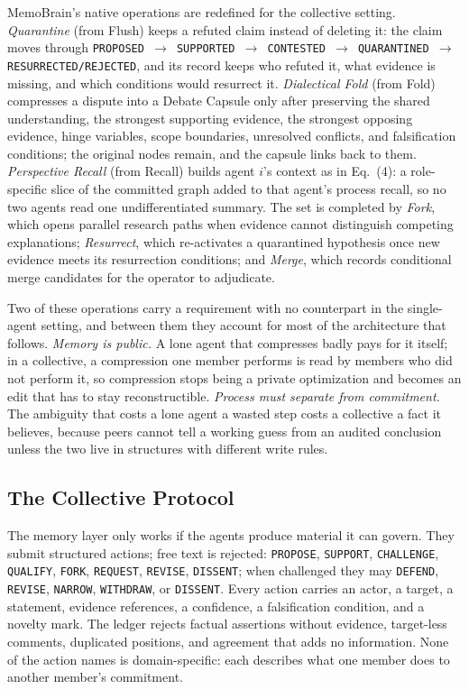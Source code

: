MemoBrain's native operations are redefined for the collective setting.
\emph{Quarantine} (from Flush) keeps a refuted claim instead of deleting it:
the claim moves through \texttt{PROPOSED $\rightarrow$ SUPPORTED $\rightarrow$
CONTESTED $\rightarrow$ QUARANTINED $\rightarrow$ RESURRECTED/REJECTED}, and
its record keeps who refuted it, what evidence is missing, and which conditions
would resurrect it. \emph{Dialectical Fold} (from Fold) compresses a dispute
into a Debate Capsule only after preserving the shared understanding, the
strongest supporting evidence, the strongest opposing evidence, hinge
variables, scope boundaries, unresolved conflicts, and falsification
conditions; the original nodes remain, and the capsule links back to them.
\emph{Perspective Recall} (from Recall) builds agent $i$'s context as in
Eq.~(4): a role-specific slice of the committed graph added to that agent's
process recall, so no two agents read one undifferentiated summary. The set is
completed by \emph{Fork}, which opens parallel research paths when evidence
cannot distinguish competing explanations; \emph{Resurrect}, which re-activates
a quarantined hypothesis once new evidence meets its resurrection conditions;
and \emph{Merge}, which records conditional merge candidates for the operator
to adjudicate.

Two of these operations carry a requirement with no counterpart in the
single-agent setting, and between them they account for most of the
architecture that follows. \emph{Memory is public.} A lone agent that
compresses badly pays for it itself; in a collective, a compression one member
performs is read by members who did not perform it, so compression stops being
a private optimization and becomes an edit that has to stay reconstructible.
\emph{Process must separate from commitment.} The ambiguity that costs a lone
agent a wasted step costs a collective a fact it believes, because peers cannot
tell a working guess from an audited conclusion unless the two live in
structures with different write rules.

\subsection{The Collective Protocol}
\label{sec:protocol}

The memory layer only works if the agents produce material it can govern. They
submit structured actions; free text is rejected: \texttt{PROPOSE},
\texttt{SUPPORT}, \texttt{CHALLENGE}, \texttt{QUALIFY}, \texttt{FORK},
\texttt{REQUEST}, \texttt{REVISE}, \texttt{DISSENT}; when challenged they may
\texttt{DEFEND}, \texttt{REVISE}, \texttt{NARROW}, \texttt{WITHDRAW}, or
\texttt{DISSENT}. Every action carries an actor, a target, a statement,
evidence references, a confidence, a falsification condition, and a novelty
mark. The ledger rejects factual assertions without evidence, target-less
comments, duplicated positions, and agreement that adds no information. None of
the action names is domain-specific: each describes what one member does to
another member's commitment.

